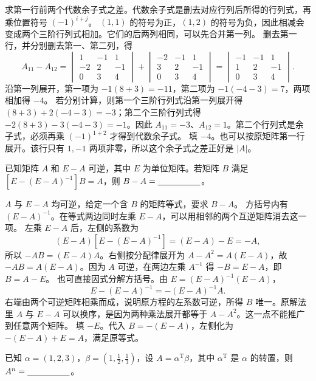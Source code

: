 \documentclass[UTF8,zihao=-4,fontset=fandol]{ctexart}
\begin{document}
\Solution
\Known 求第一行前两个代数余子式之差。代数余子式是删去对应行列后所得的行列式，再乘位置符号 $(-1)^{i+j}$。
\Method $(1,1)$ 的符号为正，$(1,2)$ 的符号为负，因此相减会变成两个三阶行列式相加。它们的后两列相同，可以先合并第一列。
\Derive 删去第一行，并分别删去第一、第二列，得
\[
A_{11}-A_{12}=
\begin{vmatrix}1&-1&1\\-2&2&-1\\0&3&4\end{vmatrix}
+\begin{vmatrix}-2&-1&1\\3&2&-1\\0&3&4\end{vmatrix}
=\begin{vmatrix}-1&-1&1\\1&2&-1\\0&3&4\end{vmatrix}.
\]
沿第一列展开，第一项为 $-1(8+3)=-11$，第二项为 $-1(-4-3)=7$，两项相加得 $-4$。
若分别计算，则第一个三阶行列式沿第一列展开得 $(8+3)+2(-4-3)=-3$；第二个三阶行列式得 $-2(8+3)-3(-4-3)=-1$。因此 $A_{11}=-3$、$A_{12}=1$。第二个行列式是余子式，必须再乘 $(-1)^{1+2}$ 才得到代数余子式。
\Verify 填 $\boxed{-4}$。也可以按原矩阵第一行展开。该行只有 $1,-1$ 两项非零，所以这个余子式之差正好是 $|A|$。

已知矩阵 $A$ 和 $E-A$ 可逆，其中 $E$ 为单位矩阵。若矩阵 $B$ 满足 $[E-(E-A)^{-1}]B=A$，则 $B-A=\underline{\hspace{5em}}$。

\Solution
\Known $A$ 与 $E-A$ 均可逆，给定一个含 $B$ 的矩阵等式，要求 $B-A$。
\Method 方括号内有 $(E-A)^{-1}$。在等式两边同时左乘 $E-A$，可以用相邻的两个互逆矩阵消去这一项。
\Derive 左乘 $E-A$ 后，左侧的系数为
\[
(E-A)[E-(E-A)^{-1}]=(E-A)-E=-A,
\]
所以 $-AB=(E-A)A$。右侧按分配律展开为 $A-A^2=A(E-A)$，故 $-AB=A(E-A)$。因为 $A$ 可逆，在两边左乘 $A^{-1}$ 得 $-B=E-A$，即 $B=A-E$。
也可直接因式分解方括号。由 $E=(E-A)^{-1}(E-A)$，
\[
E-(E-A)^{-1}=-(E-A)^{-1}A.
\]
右端由两个可逆矩阵相乘而成，说明原方程的左系数可逆，所得 $B$ 唯一。原解法里 $A$ 与 $E-A$ 可以换序，是因为两种乘法展开都等于 $A-A^2$。这一点不能推广到任意两个矩阵。
\Verify 填 $\boxed{-E}$。代入 $B=-(E-A)$，左侧化为 $-(E-A)+E=A$，满足原等式。

已知 $\alpha=(1,2,3)$，$\beta=\left(1,\frac{1}{2},\frac{1}{3}\right)$，设 $A=\alpha^{\mathrm T}\beta$，其中 $\alpha^{\mathrm T}$ 是 $\alpha$ 的转置，则 $A^n=\underline{\hspace{5em}}$。
\end{document}
